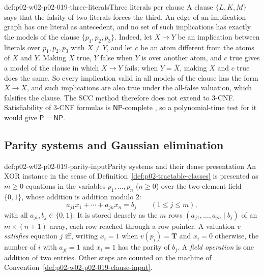 \begin{hbwarning}{def:p02-w02-p02-019-three-literals}{Three literals per clause}
A clause \(\{L,K,M\}\) says that the falsity of two literals forces the
third.  An edge of an implication graph has one literal as antecedent, and no
set of such implications has exactly the models of the clause
\(\{p_1,p_2,p_3\}\).  Indeed, let \(X\to Y\) be an implication between
literals over \(p_1,p_2,p_3\) with \(X\neq Y\), and let \(c\) be an atom
different from the atoms of \(X\) and \(Y\).  Making \(X\) true, \(Y\) false
when \(Y\) is over another atom, and \(c\) true gives a model of the clause in
which \(X\to Y\) fails; when \(Y=\overline X\), making \(X\) and \(c\) true
does the same.  So every implication valid in all models of the clause has
the form \(X\to X\), and such implications are also true under the all-false
valuation, which falsifies the clause.  The SCC method therefore does not
extend to 3-CNF.
Satisfiability of 3-CNF formulas is \(\mathsf{NP}\)-complete
\cite[thm.~2.10]{AroraBarak2009}, so a polynomial-time test for it would give
\(\mathsf P=\mathsf{NP}\).
\end{hbwarning}

\subsection{Parity systems and Gaussian elimination}
\label{sec:p02-w02-p02-019-xor}

\begin{hbconvention}{def:p02-w02-p02-019-parity-input}{Parity systems and their dense presentation}
An XOR instance in the sense of Definition~\ref{def:p02-tractable-classes}
is presented as \(m\geq 0\) equations in the variables \(p_1,\ldots,p_n\)
(\(n\geq 0\)) over the two-element field \(\{0,1\}\), whose addition is
addition modulo \(2\):
\[
  a_{j1}x_1+\cdots+a_{jn}x_n=b_j\qquad(1\leq j\leq m),
\]
with all \(a_{ji},b_j\in\{0,1\}\).  It is stored densely as the \(m\) rows
\((a_{j1},\ldots,a_{jn}\mid b_j)\) of an \(m\times(n+1)\) array, each row
reached through a row pointer.  A valuation \(v\) \emph{satisfies} equation
\(j\) iff, writing \(x_i=1\) when \(v(p_i)=\mathbf{T}\) and \(x_i=0\)
otherwise, the number of \(i\) with \(a_{ji}=1\) and \(x_i=1\) has the parity
of \(b_j\).  A \emph{field operation} is one addition of two entries.  Other
steps are counted on the machine of
Convention~\ref{def:p02-w02-p02-019-clause-input}.
\end{hbconvention}

